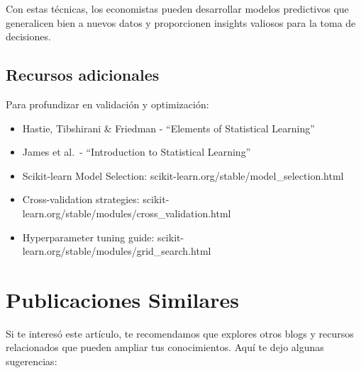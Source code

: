 \documentclass[
  doc,
  floatsintext,
  longtable,
  a4paper,
  nolmodern,
  notxfonts,
  notimes,
  12pt,
  colorlinks=true,linkcolor=blue,citecolor=blue,urlcolor=blue]{apa7}
\providecommand{\tightlist}{%
  \setlength{\itemsep}{0pt}\setlength{\parskip}{0pt}}
\begin{document}
Con estas técnicas, los economistas pueden desarrollar modelos
predictivos que generalicen bien a nuevos datos y proporcionen insights
valiosos para la toma de decisiones.

\subsection{Recursos adicionales}\label{recursos-adicionales}

Para profundizar en validación y optimización:

\begin{itemize}
\tightlist
\item
  Hastie, Tibshirani \& Friedman - ``Elements of Statistical Learning''
\item
  James et al.~- ``Introduction to Statistical Learning''
\item
  Scikit-learn Model Selection:
  scikit-learn.org/stable/model\_selection.html
\item
  Cross-validation strategies:
  scikit-learn.org/stable/modules/cross\_validation.html
\item
  Hyperparameter tuning guide:
  scikit-learn.org/stable/modules/grid\_search.html
\end{itemize}

\section{Publicaciones Similares}\label{publicaciones-similares}

Si te interesó este artículo, te recomendamos que explores otros blogs y
recursos relacionados que pueden ampliar tus conocimientos. Aquí te dejo
algunas sugerencias:
\end{document}
